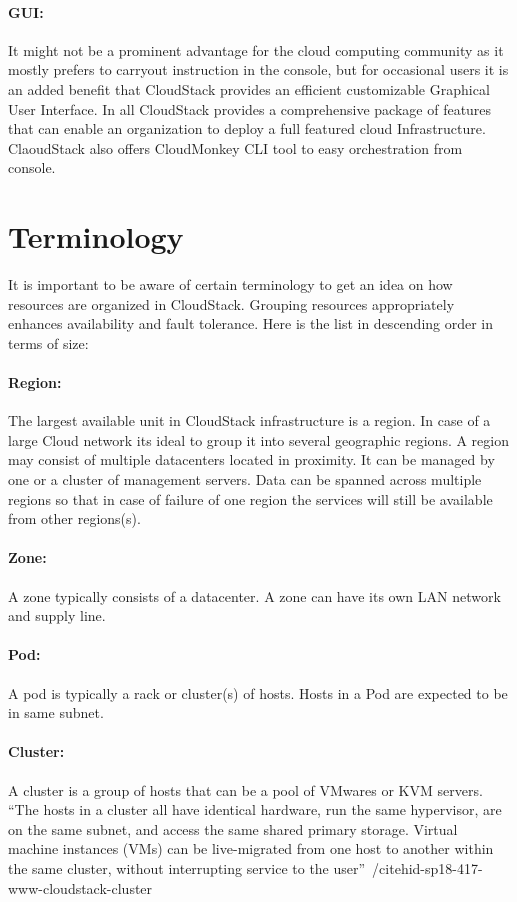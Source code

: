 \paragraph{GUI:} It might not be a prominent advantage for the cloud
computing community as it mostly prefers to carryout instruction in
the console, but for occasional users it is an added benefit that
CloudStack provides an efficient customizable Graphical User
Interface. In all CloudStack provides a comprehensive package of
features that can enable an organization to deploy a full featured
cloud Infrastructure. ClaoudStack also offers CloudMonkey CLI 
tool to easy orchestration from console.

\section{Terminology}

It is important to be aware of certain terminology to get an idea on
how resources are organized in CloudStack. Grouping resources 
appropriately enhances availability and fault tolerance. Here is the 
list in descending order in terms of size:
\paragraph{Region:}	The largest available unit in CloudStack infrastructure is a 
region. In case of a large Cloud network its ideal to group it into 
several geographic regions. A region may consist of multiple datacenters
located in proximity. It can be managed by one or a cluster of management
servers. Data can be spanned across multiple regions so that in case of
failure of one region the services will still be available from other regions(s).
\paragraph{Zone:}	A zone typically consists of a datacenter. A zone can have its own LAN
network and supply line. 
\paragraph{Pod:}	A pod is typically a rack or cluster(s) of hosts. Hosts in a Pod are 
expected to be in same subnet. 
\paragraph{Cluster:} 	A cluster is a group of hosts that can be a pool of VMwares or KVM 
servers. ``The hosts in a cluster all have identical hardware, run the same 
hypervisor, are on the same subnet, and access the same shared primary storage.
Virtual machine instances (VMs) can be live-migrated from one host to another
within the same cluster, without interrupting service to the user''~/cite{hid-sp18-417-www-cloudstack-cluster}
